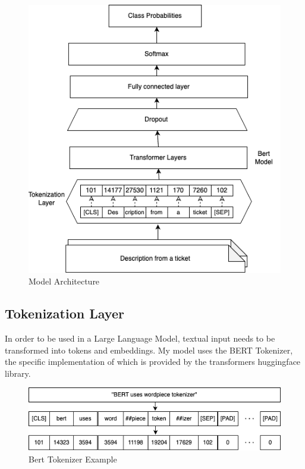 \documentclass{UoYCSproject}
\begin{document}
    \begin{figure}[h]
        \includegraphics[width=\textwidth]{./figures/prbx.drawio}
        \caption{Model Architecture}
        \label{fig:model-architecture}
    \end{figure}


    \subsection[tokenization-layer]{Tokenization Layer}
    In order to be used in a Large Language Model, textual input needs to be transformed into tokens and embeddings.
    My model uses the BERT Tokenizer, the specific implementation of which is provided by the transformers huggingface library. \par

    \begin{figure}[h]
        \includegraphics[width=\textwidth]{./figures/tokenizer-example}
        \caption{Bert Tokenizer Example}
        \label{fig:tokenizer-figure}
    \end{figure}
\end{document}
